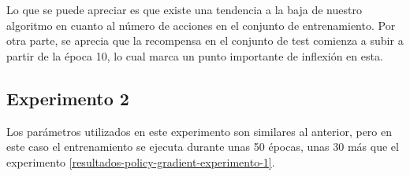 Lo que se puede apreciar es que existe una tendencia a la baja de nuestro algoritmo en cuanto al número de acciones en el conjunto de entrenamiento. Por otra parte, se aprecia que la recompensa en el conjunto de test comienza a subir a partir de la época 10, lo cual marca un punto importante de inflexión en esta. 

\subsection{Experimento 2}
\label{resultados-policy-gradient-experimento-2}

Los parámetros utilizados en este experimento son similares al anterior, pero en este caso el entrenamiento se ejecuta durante unas 50 épocas, unas 30 más que el experimento \ref{resultados-policy-gradient-experimento-1}.
\medskip

